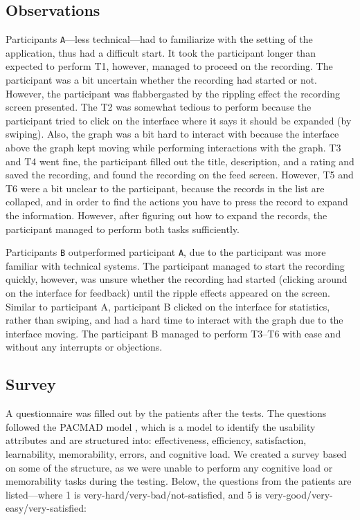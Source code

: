 \subsection{Observations}
Participants \verb|A|---less technical---had to familiarize with the setting of the application, thus had a difficult start. It took the participant longer than expected to perform T1, however, managed to proceed on the recording. The participant was a bit uncertain whether the recording had started or not. However, the participant was flabbergasted by the rippling effect the recording screen presented. The T2 was somewhat tedious to perform because the participant tried to click on the interface where it says it should be expanded (by swiping). Also, the graph was a bit hard to interact with because the interface above the graph kept moving while performing interactions with the graph. T3 and T4 went fine, the participant filled out the title, description, and a rating and saved the recording, and found the recording on the feed screen. However, T5 and T6 were a bit unclear to the participant, because the records in the list are collaped, and in order to find the actions you have to press the record to expand the information. However, after figuring out how to expand the records, the participant managed to perform both tasks sufficiently.

Participants \verb|B| outperformed participant \verb|A|, due to the participant was more familiar with technical systems. The participant managed to start the recording quickly, however, was unsure whether the recording had started (clicking around on the interface for feedback) until the ripple effects appeared on the screen. Similar to participant A, participant B clicked on the interface for statistics, rather than swiping, and had a hard time to interact with the graph due to the interface moving. The participant B managed to perform T3--T6 with ease and without any interrupts or objections. 

\subsection{Survey}
A questionnaire was filled out by the patients after the tests. The questions followed the PACMAD model \cite{pacmad}, which is a model to identify the usability attributes and are structured into: effectiveness, efficiency, satisfaction, learnability, memorability, errors, and cognitive load. We created a survey based on some of the structure, as we were unable to perform any cognitive load or memorability tasks during the testing. Below, the questions from the patients are listed---where 1 is very-hard/very-bad/not-satisfied, and 5 is very-good/very-easy/very-satisfied: 

